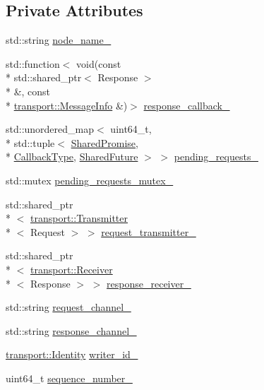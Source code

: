 \subsection*{Private Attributes}
\begin{DoxyCompactItemize}
\item 
std\-::string \hyperlink{classapollo_1_1cyber_1_1Client_a742636a4c7f051463094919eaa9e6165}{node\-\_\-name\-\_\-}
\item 
std\-::function$<$ void(const \\*
std\-::shared\-\_\-ptr$<$ Response $>$\\*
 \&, const \\*
\hyperlink{classapollo_1_1cyber_1_1transport_1_1MessageInfo}{transport\-::\-Message\-Info} \&)$>$ \hyperlink{classapollo_1_1cyber_1_1Client_a19e85f76c829899b989a7fcafe5aae97}{response\-\_\-callback\-\_\-}
\item 
std\-::unordered\-\_\-map$<$ uint64\-\_\-t, \\*
std\-::tuple$<$ \hyperlink{classapollo_1_1cyber_1_1Client_aefa3f85f666c6495bdf92c1bacb36802}{Shared\-Promise}, \\*
\hyperlink{classapollo_1_1cyber_1_1Client_a995b86997b158bccf18e65dd077cf406}{Callback\-Type}, \hyperlink{classapollo_1_1cyber_1_1Client_ae8316f7e75af5319222df2dce376eebc}{Shared\-Future} $>$ $>$ \hyperlink{classapollo_1_1cyber_1_1Client_acf3fd35613077fc52bf4706c5ee4b69f}{pending\-\_\-requests\-\_\-}
\item 
std\-::mutex \hyperlink{classapollo_1_1cyber_1_1Client_a63eaaeb862aaa0ad2d7b2314bfb4fd6e}{pending\-\_\-requests\-\_\-mutex\-\_\-}
\item 
std\-::shared\-\_\-ptr\\*
$<$ \hyperlink{classapollo_1_1cyber_1_1transport_1_1Transmitter}{transport\-::\-Transmitter}\\*
$<$ Request $>$ $>$ \hyperlink{classapollo_1_1cyber_1_1Client_a1586ab328b13d0f26190e13d78c5eb63}{request\-\_\-transmitter\-\_\-}
\item 
std\-::shared\-\_\-ptr\\*
$<$ \hyperlink{classapollo_1_1cyber_1_1transport_1_1Receiver}{transport\-::\-Receiver}\\*
$<$ Response $>$ $>$ \hyperlink{classapollo_1_1cyber_1_1Client_ad9afa7f2bd2f2fec4c3af05104b5d21a}{response\-\_\-receiver\-\_\-}
\item 
std\-::string \hyperlink{classapollo_1_1cyber_1_1Client_a164eeec085d6018b94887d920afc4d8d}{request\-\_\-channel\-\_\-}
\item 
std\-::string \hyperlink{classapollo_1_1cyber_1_1Client_a8c0017f09d7384b81c4c82a1707f6d2f}{response\-\_\-channel\-\_\-}
\item 
\hyperlink{classapollo_1_1cyber_1_1transport_1_1Identity}{transport\-::\-Identity} \hyperlink{classapollo_1_1cyber_1_1Client_a9b8f371424fa143d2dff7397fdfdc177}{writer\-\_\-id\-\_\-}
\item 
uint64\-\_\-t \hyperlink{classapollo_1_1cyber_1_1Client_a701360a2ff5dc2d4615f539e344c65f6}{sequence\-\_\-number\-\_\-}
\end{DoxyCompactItemize}
